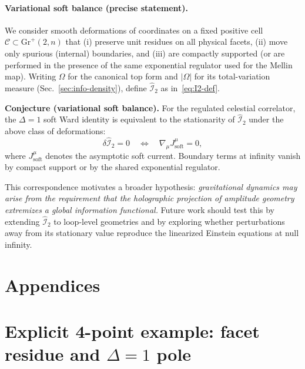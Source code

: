 \documentclass[11pt]{article}
\begin{document}
\vspace{3pt}
\noindent

\paragraph{Variational soft balance (precise statement).}
We consider smooth deformations of coordinates on a fixed positive cell
\(\mathcal{C}\subset \mathrm{Gr}^{+}(2,n)\) that (i) preserve unit residues on all physical facets,
(ii) move only spurious (internal) boundaries, and (iii) are compactly supported
(or are performed in the presence of the same exponential regulator used for the Mellin map).
Writing \(\Omega\) for the canonical top form and \(|\Omega|\) for its total-variation
measure (Sec.~\ref{sec:info-density}), define \(\widehat{\mathcal I}_2\) as in~\eqref{eq:I2-def}.

\noindent\textbf{Conjecture (variational soft balance).}
For the regulated celestial correlator, the \(\Delta=1\) soft Ward identity is equivalent
to the stationarity of \(\widehat{\mathcal I}_2\) under the above class of deformations:
\begin{equation}
\delta\widehat{\mathcal I}_2 = 0
\quad\Longleftrightarrow\quad
\nabla_{\!\mu} J^\mu_{\text{soft}} = 0,
\label{eq:entropy-gravity}
\end{equation}
where \(J^\mu_{\text{soft}}\) denotes the asymptotic soft current.
Boundary terms at infinity vanish by compact support or by the shared exponential regulator.



\vspace{3pt}
\noindent
This correspondence motivates a broader hypothesis: \emph{gravitational dynamics may arise from the requirement that the holographic projection of amplitude geometry extremizes a global information functional.}  
Future work should test this by extending $\widehat{\mathcal I}_2$ to loop-level geometries and by exploring whether perturbations away from its stationary value reproduce the linearized Einstein equations at null infinity.

\appendix
\section*{Appendices}

\section{Explicit 4-point example: facet residue and \texorpdfstring{$\Delta=1$}{Delta=1} pole}
\label{app:4pt-example}
\end{document}
